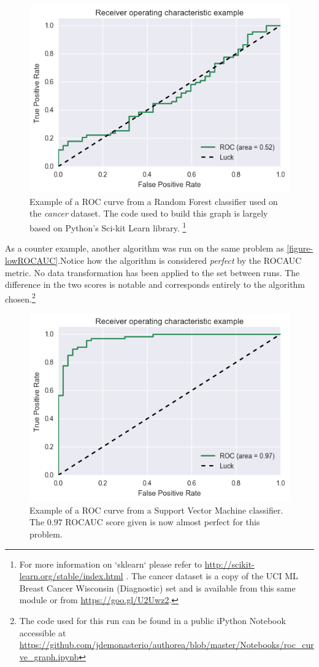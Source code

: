 \begin{figure}[h!]
\begin{center}
\includegraphics[width=0.7\columnwidth]{figures/figure-lowROCAUC/figure-lowROCAUC_original}
\caption{Example of a ROC curve from a Random Forest classifier used on the \textit{cancer} dataset.  The code used to build this graph is largely based on Python's Sci-kit Learn library. \protect\footnote{For more information on `sklearn` please refer to \url{http://scikit-learn.org/stable/index.html} \protect\textcite{sci-kit} . The cancer dataset is a copy of the UCI ML Breast Cancer Wisconsin (Diagnostic) set and is available from this same module or from \url{https://goo.gl/U2Uwz2}.}  }
\end{center}
\end{figure}
%

As a counter example, another algorithm was run on the same problem as \ref{figure-lowROCAUC}.Notice how the algorithm is considered \textit{perfect} by the ROCAUC metric. No data transformation has been applied to the set between runs. The difference in the two scores is notable and corresponds entirely to the algorithm chosen.\footnote{The code used for this run can be found in a public iPython Notebook accessible at \url{https://github.com/jdemonasterio/authorea/blob/master/Notebooks/roc_curve_graph.ipynb}}

\begin{figure}[h!]
\begin{center}
\includegraphics[width=0.7\columnwidth]{figures/figure-highROCAUC/figure-highROCAUC}
\caption{Example of a ROC curve from a Support Vector Machine classifier. The $0.97$ ROCAUC score given is now almost perfect for this problem.%
}
\end{center}
\end{figure}

